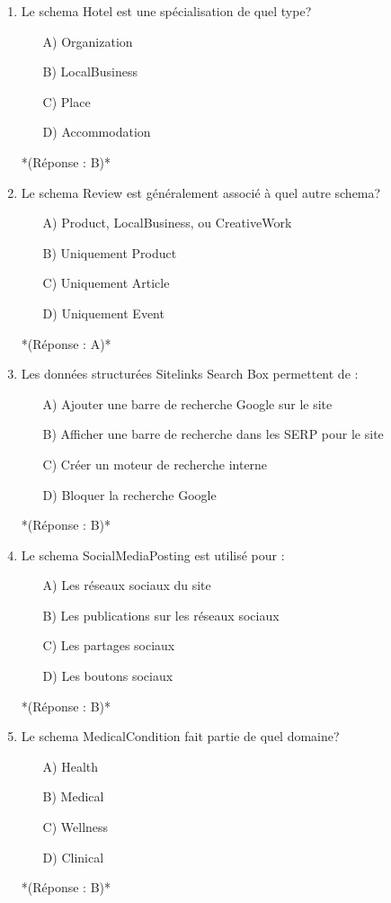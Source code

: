 \documentclass[12pt,a4paper,twoside]{report}
\begin{document}
\begin{enumerate}
\item Le schema Hotel est une spécialisation de quel type?
\begin{itemize}
\item[A)] Organization
\item[B)] LocalBusiness
\item[C)] Place
\item[D)] Accommodation
\end{itemize}
*(Réponse : B)*

\item Le schema Review est généralement associé à quel autre schema?
\begin{itemize}
\item[A)] Product, LocalBusiness, ou CreativeWork
\item[B)] Uniquement Product
\item[C)] Uniquement Article
\item[D)] Uniquement Event
\end{itemize}
*(Réponse : A)*

\item Les données structurées Sitelinks Search Box permettent de :
\begin{itemize}
\item[A)] Ajouter une barre de recherche Google sur le site
\item[B)] Afficher une barre de recherche dans les SERP pour le site
\item[C)] Créer un moteur de recherche interne
\item[D)] Bloquer la recherche Google
\end{itemize}
*(Réponse : B)*

\item Le schema SocialMediaPosting est utilisé pour :
\begin{itemize}
\item[A)] Les réseaux sociaux du site
\item[B)] Les publications sur les réseaux sociaux
\item[C)] Les partages sociaux
\item[D)] Les boutons sociaux
\end{itemize}
*(Réponse : B)*

\item Le schema MedicalCondition fait partie de quel domaine?
\begin{itemize}
\item[A)] Health
\item[B)] Medical
\item[C)] Wellness
\item[D)] Clinical
\end{itemize}
*(Réponse : B)*


\end{enumerate}
\end{document}

